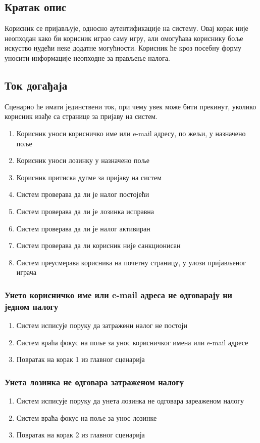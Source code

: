 \subsection{Кратак опис}
Корисник се пријављује, односно аутентификације на систему. Овај корак није неопходан како би корисник играо
саму игру, али омогућава кориснику боље искуство нудећи неке додатне могућности.
Корисник ће кроз посебну форму уносити информације неопходне за прављење налога.

\subsection{Ток догађаја}
Сценарио ће имати јединствени ток, при чему увек може бити прекинут, уколико корисник изађе са странице
за пријаву на систем.

\begin{enumerate}
    \item Корисник уноси корисничко име или e-mail адресу, по жељи, у назначено поље
    \item Корисник уноси лозинку у назначено поље
    \item Корисник притиска дугме за пријаву на систем
    \item Систем проверава да ли је налог постојећи
    \item Систем проверава да ли је лозинка исправна
    \item Систем проверава да ли је налог активиран
    \item Систем проверава да ли корисник није санкционисан
    \item Систем преусмерава корисника на почетну страницу, у улози пријављеног играча
\end{enumerate}


\subsubsection{Унето корисничко име или e-mail адреса не одговарају ни једном налогу}
\begin{enumerate}[label=4.\arabic*]
    \item Систем исписује поруку да затражени налог не постоји
    \item Систем враћа фокус на поље за унос корисничког имена или e-mail адресе
    \item Повратак на корак 1 из главног сценарија
\end{enumerate}

\subsubsection{Унета лозинка не одговара затраженом налогу}
\begin{enumerate}[label=5.\arabic*]
    \item Систем исписује поруку да унета лозинка не одговара зареаженом налогу
    \item Систем враћа фокус на поље за унос лозинке
    \item Повратак на корак 2 из главног сценарија
\end{enumerate}

